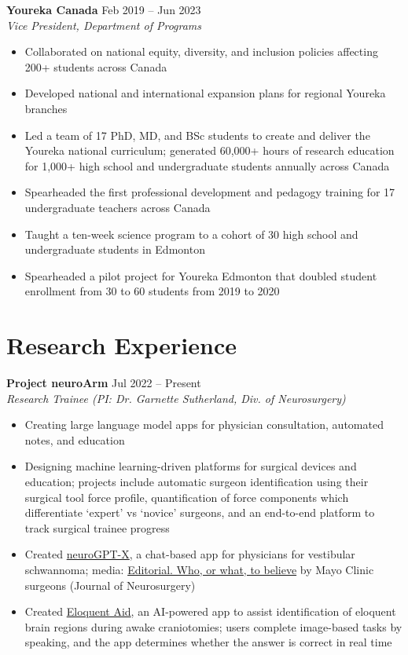 \documentclass{article}
\begin{document}
\textbf{Youreka Canada} \hfill Feb 2019 -- Jun 2023 \\
\textit{Vice President, Department of Programs}
\begin{itemize}
    \item Collaborated on national equity, diversity, and inclusion policies affecting 200+ students across Canada
    \item Developed national and international expansion plans for regional Youreka branches
    \item Led a team of 17 PhD, MD, and BSc students to create and deliver the Youreka national curriculum; generated 60,000+ hours of research education for 1,000+ high school and undergraduate students annually across Canada
    \item Spearheaded the first professional development and pedagogy training for 17 undergraduate teachers across Canada
    \item Taught a ten-week science program to a cohort of 30 high school and undergraduate students in Edmonton
    \item Spearheaded a pilot project for Youreka Edmonton that doubled student enrollment from 30 to 60 students from 2019 to 2020
\end{itemize}


\section*{\textcolor{my_colour}{Research Experience}}
\vspace{-.25em} \hrulefill \vspace{.25em}

\textbf{Project neuroArm} \hfill Jul 2022 -- Present\\
\textit{Research Trainee (PI: Dr. Garnette Sutherland, Div. of Neurosurgery)}
\begin{itemize}
    \item Creating large language model apps for physician consultation, automated notes, and education
    \item Designing machine learning-driven platforms for surgical devices and education; projects include automatic surgeon identification using their surgical tool force profile, quantification of force components which differentiate `expert' vs `novice' surgeons, and an end-to-end platform to track surgical trainee progress
    \item Created \href{https://neurogpt-x.azurewebsites.net/}{neuroGPT-X}, a chat-based app for physicians for vestibular schwannoma; media: \href{https://thejns.org/view/journals/j-neurosurg/139/4/article-p1001.xml}{Editorial. Who, or what, to believe} by Mayo Clinic surgeons (Journal of Neurosurgery)
    \item Created \href{https://www.eloquentaid.com/}{Eloquent Aid}, an AI-powered app to assist identification of eloquent brain regions during awake craniotomies; users complete image-based tasks by speaking, and the app determines whether the answer is correct in real time
\end{itemize} \vspace{1em}
\end{document}
